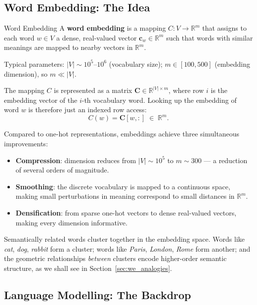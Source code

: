 \documentclass[11pt,a4paper]{article}
\newcommand{\term}[1]{\textcolor{DefGreen}{\textbf{#1}}}
\begin{document}
\subsection{Word Embedding: The Idea}
\label{sec:we_idea}

\begin{defbox}{Word Embedding}
A \term{word embedding} is a mapping $C: V \to \mathbb{R}^m$ that assigns to each word $w \in V$ a dense, real-valued vector $\mathbf{c}_w \in \mathbb{R}^m$ such that words with similar meanings are mapped to nearby vectors in $\mathbb{R}^m$.

Typical parameters: $|V| \sim 10^5$--$10^6$ (vocabulary size); $m \in [100, 500]$ (embedding dimension), so $m \ll |V|$.
\end{defbox}

The mapping $C$ is represented as a matrix $\mathbf{C} \in \mathbb{R}^{|V| \times m}$, where row $i$ is the embedding vector of the $i$-th vocabulary word. Looking up the embedding of word $w$ is therefore just an indexed row access:
\[
  C(w) = \mathbf{C}[w, :] \;\in\; \mathbb{R}^m.
\]

Compared to one-hot representations, embeddings achieve three simultaneous improvements:
\begin{itemize}
  \item \textbf{Compression}: dimension reduces from $|V| \sim 10^5$ to $m \sim 300$ — a reduction of several orders of magnitude.
  \item \textbf{Smoothing}: the discrete vocabulary is mapped to a continuous space, making small perturbations in meaning correspond to small distances in $\mathbb{R}^m$.
  \item \textbf{Densification}: from sparse one-hot vectors to dense real-valued vectors, making every dimension informative.
\end{itemize}

Semantically related words cluster together in the embedding space. Words like \textit{cat}, \textit{dog}, \textit{rabbit} form a cluster; words like \textit{Paris}, \textit{London}, \textit{Rome} form another; and the geometric relationships \emph{between} clusters encode higher-order semantic structure, as we shall see in Section~\ref{sec:we_analogies}.

\subsection{Language Modelling: The Backdrop}
\label{sec:we_langmodel}
\end{document}
